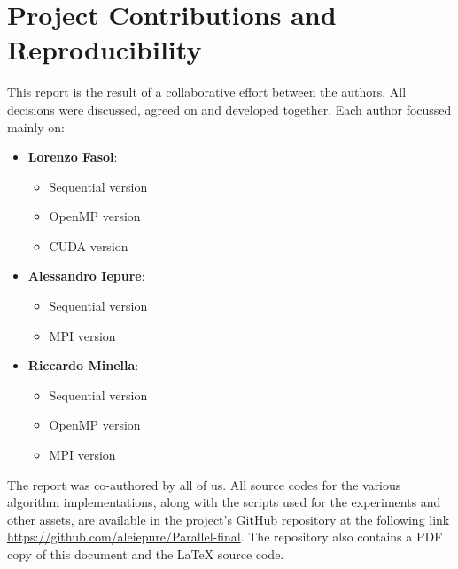 \section{Project Contributions and Reproducibility}

This report is the result of a collaborative effort between the authors. All decisions %
were discussed, agreed on and developed together. Each author focussed mainly on:
\begin{itemize}
    \item \textbf{Lorenzo Fasol}:
        \begin{itemize}
            \item Sequential version
            \item OpenMP version
            \item CUDA version
        \end{itemize}
    \item \textbf{Alessandro Iepure}:
        \begin{itemize}
            \item Sequential version
            \item MPI version
        \end{itemize}
    \item \textbf{Riccardo Minella}:
        \begin{itemize}
            \item Sequential version
            \item OpenMP version
            \item MPI version
        \end{itemize}
\end{itemize}
The report was co-authored by all of us. All source codes for the various algorithm %
implementations, along with the scripts used for the experiments and other assets, %
are available in the project's GitHub repository at the following link %
\url{https://github.com/aleiepure/Parallel-final}. The repository also contains %
a PDF copy of this document and the \LaTeX{} source code.
